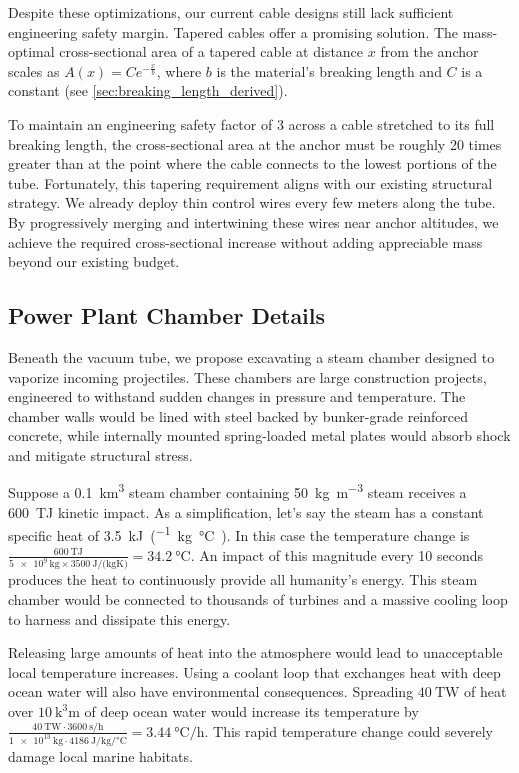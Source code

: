\documentclass{article}
\begin{document}
Despite these optimizations, our current cable designs still lack sufficient engineering safety margin. Tapered cables offer a promising solution. The mass-optimal cross-sectional area of a tapered cable at distance $x$ from the anchor scales as $A(x) = C e^{-\frac{x}{b}}$, where $b$ is the material's breaking length and $C$ is a constant (see \autoref{sec:breaking_length_derived}). 

To maintain an engineering safety factor of 3 across a cable stretched to its full breaking length, the cross-sectional area at the anchor must be roughly 20 times greater than at the point where the cable connects to the lowest portions of the tube. Fortunately, this tapering requirement aligns with our existing structural strategy. We already deploy thin control wires every few meters along the tube. By progressively merging and intertwining these wires near anchor altitudes, we achieve the required cross-sectional increase without adding appreciable mass beyond our existing budget.



\subsection{Power Plant Chamber Details}
Beneath the vacuum tube, we propose excavating a steam chamber designed to vaporize incoming projectiles. These chambers are large construction projects, engineered to withstand sudden changes in pressure and temperature.  The chamber walls would be lined with steel backed by bunker-grade reinforced concrete, while internally mounted spring-loaded metal plates would absorb shock and mitigate structural stress.  

Suppose a \SI{0.1}{\cubic\kilo\meter} steam chamber containing \SI{50}{\kilo\gram\per\cubic\meter} steam receives a \SI{600}{\tera\joule} kinetic impact.   As a simplification, let's say the steam has a constant specific heat of \SI{3.5}{\kilo\joule\per(\kilo\gram\celsius)}.  In this case the temperature change is 
$\frac{\SI{600}{\tera\joule}}{\SI{5e9}{\kilo\gram}\times\SI{3500}{\joule\per(\kilo\gram\kelvin)}} = \SI{34.2}{\celsius}$.  An impact of this magnitude every 10 seconds produces the heat to continuously provide all humanity's energy.  This steam chamber would be connected to thousands of turbines and a massive cooling loop to harness and dissipate this energy.  

Releasing large amounts of heat into the atmosphere would lead to unacceptable local temperature increases. Using a coolant loop that exchanges heat with deep ocean water will also have environmental consequences. Spreading $\SI{40}{\tera\watt}$ of heat over $\SI{10}{\cubic\kilo\meter}$ of deep ocean water would increase its temperature by $\frac{\SI{40}{\tera\watt}\cdot\SI{3600}{\second\per\hour}}{\SI{1e13}{\kilo\gram}\cdot\SI{4186}{\joule\per\kilo\gram\per\celsius}} = \SI{3.44}{\celsius\per\hour}$.  This rapid temperature change could severely damage local marine habitats.
\end{document}
